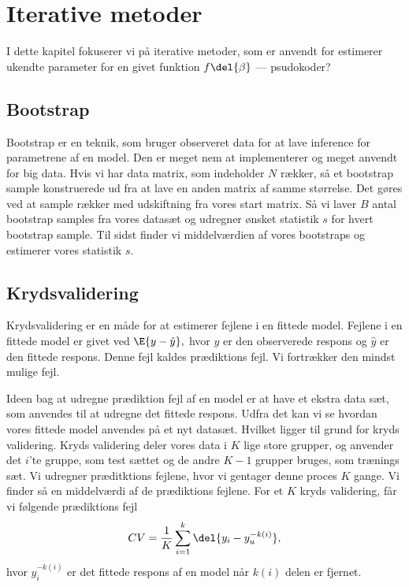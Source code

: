 \chapter{Iterative metoder}
I dette kapitel fokuserer vi på iterative metoder, som er anvendt for estimerer ukendte parameter for en givet funktion $f \del{\beta}$
--- psudokoder? 

\section{Bootstrap}
Bootstrap er en teknik, som bruger observeret data for at lave inference for parametrene af en model. 
Den er meget nem at implementerer og meget anvendt for big data. 
Hvis vi har data matrix, som indeholder $N$ rækker, så et bootstrap sample konstruerede ud fra at lave en anden matrix af samme størrelse. 
Det gøres ved at sample rækker med udskiftning fra vores start matrix. 
Så vi laver $B$ antal bootstrap samples fra vores datasæt og udregner ønsket statistik $s$ for hvert bootstrap sample. 
Til sidst finder vi middelværdien af vores bootstraps og estimerer vores statistik $s$.

\section{Krydsvalidering}
Krydsvalidering er en måde for at estimerer fejlene i en fittede model. 
Fejlene i en fittede model er givet ved $\E{y - \hat{y}},$ hvor $y$ er den observerede respons og  $\hat{y} $ er den fittede respons. 
Denne fejl kaldes prædiktions fejl.
Vi fortrækker den mindst mulige fejl. 

Ideen bag at udregne prædiktion fejl af en model er at have et ekstra data sæt, som anvendes til at udregne det fittede respons. 
Udfra det kan vi se hvordan vores fittede model anvendes på et nyt datasæt. 
Hvilket ligger til grund for kryds validering. Kryds validering deler vores data i $K$ lige store  grupper, og anvender det $i$'te gruppe, som test sættet og de andre $K-1$ grupper bruges, som trænings sæt.
Vi udregner præditktions fejlene, hvor vi gentager denne proces $K$ gange. 
Vi finder så en middelværdi af de prædiktions fejlene. 
For et $K$ kryds validering, får vi følgende prædiktions fejl
\begin{align*}
CV = \frac{1}{K} \sum_{i =1}^k \del{y_i - y_u^{-k(i)}},
\end{align*}
hvor $y_i^{-k(i)}$ er det fittede respons af en model når $k(i)$ delen er fjernet. 